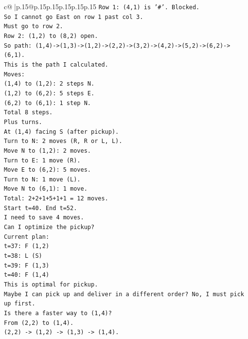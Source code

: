 \documentclass{article}
\begin{document}
{\begin{supertabular}{c@{$\;$}|p{.15\linewidth}@{}p{.15\linewidth}p{.15\linewidth}p{.15\linewidth}p{.15\linewidth}p{.15\linewidth}}
{{{\texttt{Row 1: (4,1) is '\#'. Blocked.} \\
\texttt{So I cannot go East on row 1 past col 3.} \\
\texttt{Must go to row 2.} \\
\texttt{Row 2: (1,2) to (8,2) open.} \\
\texttt{So path: (1,4){-}>(1,3){-}>(1,2){-}>(2,2){-}>(3,2){-}>(4,2){-}>(5,2){-}>(6,2){-}>(6,1).} \\
\texttt{This is the path I calculated.} \\
\texttt{Moves:} \\
\texttt{(1,4) to (1,2): 2 steps N.} \\
\texttt{(1,2) to (6,2): 5 steps E.} \\
\texttt{(6,2) to (6,1): 1 step N.} \\
\texttt{Total 8 steps.} \\
\texttt{Plus turns.} \\
\texttt{At (1,4) facing S (after pickup).} \\
\texttt{Turn to N: 2 moves (R, R or L, L).} \\
\texttt{Move N to (1,2): 2 moves.} \\
\texttt{Turn to E: 1 move (R).} \\
\texttt{Move E to (6,2): 5 moves.} \\
\texttt{Turn to N: 1 move (L).} \\
\texttt{Move N to (6,1): 1 move.} \\
\texttt{Total: 2+2+1+5+1+1 = 12 moves.} \\
\texttt{Start t=40. End t=52.} \\
\texttt{I need to save 4 moves.} \\
\texttt{Can I optimize the pickup?} \\
\texttt{Current plan:} \\
\texttt{t=37: F (1,2)} \\
\texttt{t=38: L (S)} \\
\texttt{t=39: F (1,3)} \\
\texttt{t=40: F (1,4)} \\
\texttt{This is optimal for pickup.} \\
\texttt{Maybe I can pick up and deliver in a different order? No, I must pick up first.} \\
\texttt{Is there a faster way to (1,4)?} \\
\texttt{From (2,2) to (1,4).} \\
\texttt{(2,2) {-}> (1,2) {-}> (1,3) {-}> (1,4).} \\
}}}
\end{supertabular}}
\end{document}
